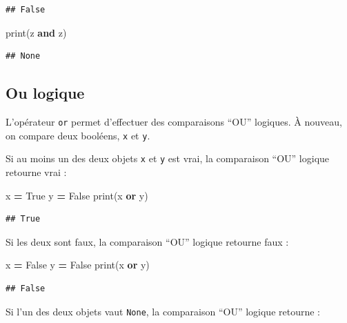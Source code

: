\documentclass[
  12pt,
]{book}
\newenvironment{Shaded}{\begin{snugshade}}{\end{snugshade}}
\newcommand{\BuiltInTok}[1]{#1}
\newcommand{\KeywordTok}[1]{\textcolor[rgb]{0.13,0.29,0.53}{\textbf{#1}}}
\newcommand{\NormalTok}[1]{#1}
\newcommand{\OperatorTok}[1]{\textcolor[rgb]{0.81,0.36,0.00}{\textbf{#1}}}
\newcommand{\VariableTok}[1]{\textcolor[rgb]{0.00,0.00,0.00}{#1}}
\numberwithin{equation}{section}
\numberwithin{countremarque}{section}
\begin{document}
\begin{lstlisting}
## False
\end{lstlisting}

\begin{Shaded}
\begin{Highlighting}[]
\BuiltInTok{print}\NormalTok{(z }\KeywordTok{and}\NormalTok{ z)}
\end{Highlighting}
\end{Shaded}

\begin{lstlisting}
## None
\end{lstlisting}

\subsection{Ou logique}\label{ou-logique}

L'opérateur \texttt{or} permet d'effectuer des comparaisons ``OU'' logiques. À nouveau, on compare deux booléens, \texttt{x} et \texttt{y}.

Si au moins un des deux objets \texttt{x} et \texttt{y} est vrai, la comparaison ``OU'' logique retourne vrai :

\begin{Shaded}
\begin{Highlighting}[]
\NormalTok{x }\OperatorTok{=} \VariableTok{True}
\NormalTok{y }\OperatorTok{=} \VariableTok{False}
\BuiltInTok{print}\NormalTok{(x }\KeywordTok{or}\NormalTok{ y)}
\end{Highlighting}
\end{Shaded}

\begin{lstlisting}
## True
\end{lstlisting}

Si les deux sont faux, la comparaison ``OU'' logique retourne faux :

\begin{Shaded}
\begin{Highlighting}[]
\NormalTok{x }\OperatorTok{=} \VariableTok{False}
\NormalTok{y }\OperatorTok{=} \VariableTok{False}
\BuiltInTok{print}\NormalTok{(x }\KeywordTok{or}\NormalTok{ y)}
\end{Highlighting}
\end{Shaded}

\begin{lstlisting}
## False
\end{lstlisting}

Si l'un des deux objets vaut \texttt{None}, la comparaison ``OU'' logique retourne :
\end{document}
